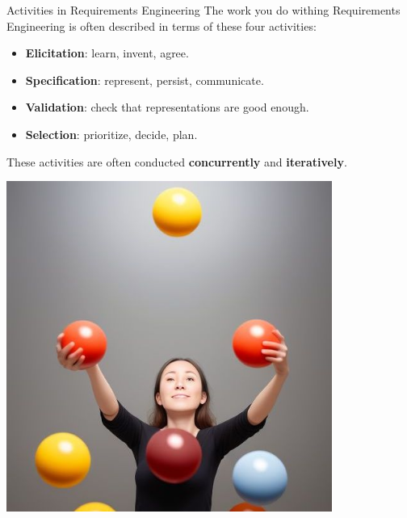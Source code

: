 \documentclass{beamer}
\begin{document}
\begin{frame}[fragile]{Activities in Requirements Engineering}
The work you do withing Requirements Engineering is often described in terms of these four activities:
\begin{itemize}
\item \textbf{Elicitation}: learn, invent, agree.
\item \textbf{Specification}: represent, persist, communicate.
\item \textbf{Validation}: check that representations are good enough.
\item \textbf{Selection}: prioritize, decide, plan.
\end{itemize}
\vspace*{1em}
\begin{minipage}[t]{0.6\textwidth}
\vspace{0pt}
These activities are often conducted \textbf{concurrently} and \textbf{iteratively}.
\end{minipage}%
\begin{minipage}[t]{0.4\textwidth}
\vspace{0pt}
\hfill\includegraphics[width=0.8\textwidth]{img/juggling-cropped}
\end{minipage}%

\end{frame}
\end{document}
